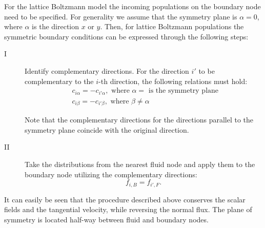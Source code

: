 \documentclass{article}
\begin{document}
For the lattice Boltzmann model the incoming populations on the boundary node need to be specified.
For generality we assume that the symmetry plane is $\alpha=0$, where $\alpha$ is the
direction $x$ or $y$. Then, for lattice Boltzmann populations the symmetric boundary conditions can
be expressed through the following steps:
\begin{description}
\item[I] Identify complementary directions. For the direction $i'$ to be complementary to the $i$-th
direction, the following relations must hold:
\begin{equation}
\begin{aligned}
&c_{i\alpha}=-c_{i'\alpha}, \text{ where $\alpha=$ is the symmetry plane }\\
&c_{i\beta}=-c_{i'\beta}, \text{ where $\beta\neq\alpha$ }
\end{aligned}
\end{equation}

Note that the complementary directions for the directions parallel to the symmetry plane coincide
with the original direction.

\item[II] Take the distributions from the nearest fluid node and
apply them to the boundary node utilizing the complementary directions:
\begin{equation}
f_{i,B}=f_{i',F}.
\end{equation}
\end{description}

It can easily be seen that the procedure described above conserves the scalar fields and the tangential
velocity, while reversing the normal flux. The plane of symmetry is located half-way between fluid
and boundary nodes. 


\end{document}
